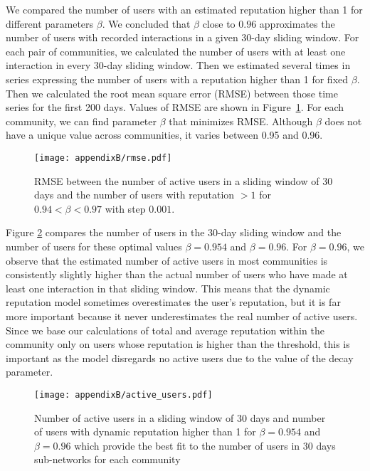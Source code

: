 We compared the number of users with an estimated reputation higher than 1 for different parameters $\beta$. We concluded that $\beta$ close to $0.96$ approximates the number of users with recorded interactions in a given 30-day sliding window. For each pair of communities, we calculated the number of users with at least one interaction in every 30-day sliding window. Then we estimated several times in series expressing the number of users with a reputation higher than 1 for fixed $\beta$. Then we calculated the root mean square error (RMSE) between those time series for the first 200 days. Values of RMSE are shown in Figure~\ref{fig:rmse}. For each community, we can find parameter $\beta$ that minimizes RMSE. Although $\beta$ does not have a unique value across communities, it varies between 0.95 and 0.96.  

\begin{figure}[h!]
	\centering
	\texttt{[image: appendixB/rmse.pdf]}
	\caption[RMSE between the number of users in 30 days sliding window and positive reputation.]{RMSE between the number of active users in a sliding window of 30 days and the number of users with reputation $>1$ for  $0.94< \beta <0.97$ with step $0.001$. }
	\label{fig:rmse}
\end{figure}

Figure \ref{fig:nusers} compares the number of users in the 30-day sliding window and the number of users for these optimal values $\beta = 0.954$ and $\beta =0.96$. For $\beta = 0.96$, we observe that the estimated number of active users in most communities is consistently slightly higher than the actual number of users who have made at least one interaction in that sliding window. This means that the dynamic reputation model sometimes overestimates the user's reputation, but it is far more important because it never underestimates the real number of active users. Since we base our calculations of total and average reputation within the community only on users whose reputation is higher than the threshold, this is important as the model disregards no active users due to the value of the decay parameter.

\begin{figure}[H]
	\centering
	\texttt{[image: appendixB/active\_users.pdf]}
	\caption[Number of users in 30 days sliding window and positive reputation.]{Number of active users in a sliding window of 30 days and number of users with dynamic reputation higher than 1 for $\beta=0.954$ and $\beta=0.96 $ which provide the best fit to the number of users in 30 days sub-networks for each community}
	\label{fig:nusers}
\end{figure}

